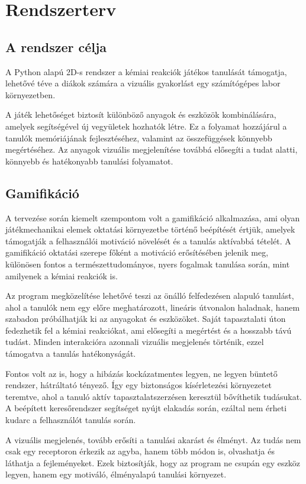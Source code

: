 \documentclass[]{thesis-ekf}
\begin{document}
	\chapter{Rendszerterv} 
	\section{A rendszer célja}
	
	A Python alapú 2D-s rendszer a kémiai reakciók játékos tanulását támogatja, lehetővé téve a diákok számára a vizuális gyakorlást egy számítógépes labor környezetben. 
	
	A játék lehetőséget biztosít különböző anyagok és eszközök kombinálására, amelyek segítségével új vegyületek hozhatók létre. Ez a folyamat hozzájárul a tanulók memóriájának fejlesztéséhez, valamint az összefüggések könnyebb megértéséhez. Az anyagok vizuális megjelenítése továbbá elősegíti a tudat alatti, könnyebb és hatékonyabb tanulási folyamatot.
	
	\section{Gamifikáció}
	
	A tervezése során kiemelt szempontom volt a gamifikáció alkalmazása, ami olyan játékmechanikai elemek oktatási környezetbe történő beépítését értjük, amelyek támogatják a felhasználói motiváció növelését és a tanulás aktívabbá tételét. A gamifikáció oktatási szerepe főként a motiváció erősítésében jelenik meg, különösen fontos a természettudományos, nyers fogalmak tanulása során, mint amilyenek a kémiai reakciók is.
	
	Az program megközelítése lehetővé teszi az önálló felfedezésen alapuló tanulást, ahol a tanulók nem egy előre meghatározott, lineáris útvonalon haladnak, hanem szabadon próbálhatják ki az anyagokat és eszközöket. Saját tapasztalati úton fedezhetik fel a kémiai reakciókat, ami elősegíti a megértést és a hosszabb távú tudást. Minden interakcióra azonnali vizuális megjelenés történik, ezzel támogatva a tanulás hatékonyságát.
	
	Fontos volt az is, hogy a hibázás kockázatmentes legyen, ne legyen büntető rendszer, hátráltató tényező. Így egy biztonságos kísérletezési környezetet teremtve, ahol a tanuló aktív tapasztalatszerzésen keresztül bővíthetik tudásukat. A beépített keresőrendszer segítséget nyújt  elakadás során, ezáltal nem érheti kudarc a felhasználót tanulás során.
	
	A vizuális megjelenés, tovább erősíti a tanulási akarást és élményt. Az tudás nem csak egy receptoron érkezik az agyba, hanem több módon is, olvashatja és láthatja a fejleményeket. Ezek biztosítják, hogy az program ne csupán egy eszköz legyen, hanem egy motiváló, élményalapú tanulási környezet.
	
\end{document}
